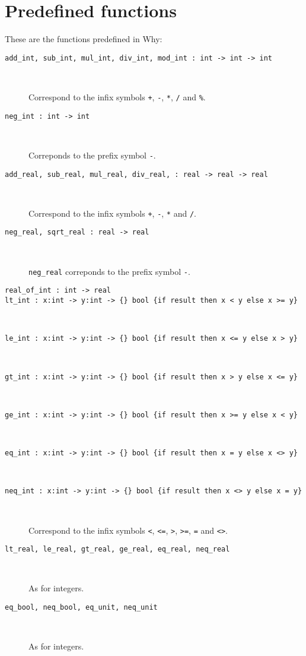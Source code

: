 \documentclass[a4paper,12pt]{report}
\newcommand{\why}{\textsf{Why}}
\begin{document}
\section{Predefined functions}

These are the functions predefined in \why:
\begin{description}
\item[\texttt{add\_int, sub\_int, mul\_int, div\_int, mod\_int : int
    -> int -> int}] ~\par
  Correspond to the infix symbols
  \texttt{+}, \texttt{-}, \texttt{*}, \texttt{/} and \texttt{\%}.

\item[\texttt{neg\_int : int -> int}] ~\par
  Correponds to the prefix symbol \texttt{-}.

\item[\texttt{add\_real, sub\_real, mul\_real, div\_real,
    : real -> real -> real}] ~\par
  Correspond to the infix symbols
  \texttt{+}, \texttt{-}, \texttt{*} and \texttt{/}.

\item[\texttt{neg\_real, sqrt\_real : real -> real}] ~\par
  \texttt{neg\_real} correponds to the prefix symbol \texttt{-}.

\item[\texttt{real\_of\_int : int -> real}]

\item[\texttt{lt\_int : x:int -> y:int -> \{\} bool \{if result then x
    < y else x >= y\}}] ~\par
\item[\texttt{le\_int : x:int -> y:int -> \{\} bool \{if result then x
    <= y else x > y\}}] ~\par
\item[\texttt{gt\_int : x:int -> y:int -> \{\} bool \{if result then x
    > y else x <= y\}}] ~\par
\item[\texttt{ge\_int : x:int -> y:int -> \{\} bool \{if result then x
    >= y else x < y\}}] ~\par
\item[\texttt{eq\_int : x:int -> y:int -> \{\} bool \{if result then x
    = y else x <> y\}}] ~\par
\item[\texttt{neq\_int : x:int -> y:int -> \{\} bool \{if result then x
    <> y else x = y\}}] ~\par
  Correspond to the infix symbols \texttt{<}, \texttt{<=}, \texttt{>},
  \texttt{>=}, \texttt{=} and \texttt{<>}.

\item[\texttt{lt\_real, le\_real, gt\_real, ge\_real, eq\_real,
    neq\_real}] ~\par
  As for integers.

\item[\texttt{eq\_bool, neq\_bool, eq\_unit, neq\_unit}] ~\par
  As for integers.

\end{description}
\end{document}
